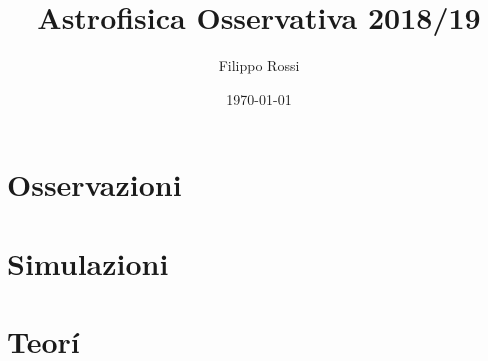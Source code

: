 \documentclass[oneside,12pt,fleqn]{memoir}
\author{Filippo Rossi}
\title{Astrofisica Osservativa 2018/19}
\date{\today}
\begin{document}
\maketitle
\tableofcontents*

\part{Osservazioni}




\part{Simulazioni}



\part{Teor\'i}
%

\end{document}
